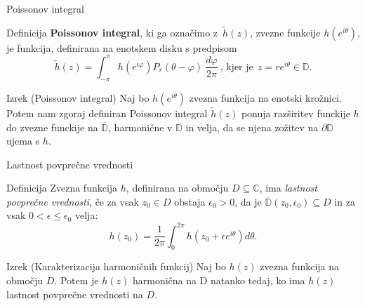 \documentclass{beamer}
\newcommand{\C}{\mathbb C}
\theoremstyle{definition}
\theoremstyle{definition}
\begin{document}
\begin{frame}{Poissonov integral}
   \begin{block}{Definicija}
      \textbf{Poissonov integral}, ki ga označimo z~$\widetilde{h}(z)$, zvezne funkcije $h(e^{i\theta})$, je funkcija, definirana na enotskem disku s predpisom
      $$
      \widetilde{h}(z) = \int_{-\pi}^{\pi}{h(e^{i\varphi}) P_r(\theta - \varphi)~\frac{d\varphi}{2 \pi}}~\text{, kjer je}~~z = r e^{i\theta} \in \mathbb{D}.
      $$
   \end{block}
   \pause
   \begin{exampleblock}{Izrek (Poissonov integral)}
      Naj bo $h(e^{i \theta})$ zvezna funkcija na enotski krožnici. 
      Potem nam zgoraj definiran Poissonov integral $\widetilde{h}(z)$ ponuja razširitev funckije $h$ do zvezne funckije na $\overline{\mathbb{D}}$, harmonične v $\mathbb{D}$ in velja, da
      se njena zožitev na $\partial \mathbb{D}$ ujema s $h$.
   \end{exampleblock}
\end{frame}

\begin{frame}{Lastnost povprečne vrednosti}
   \begin{block}{Definicija} 
      Zvezna funkcija $h$, definirana na območju $D \subseteq \C$, ima \emph{lastnost povprečne vrednosti}, če za vsak $z_0 \in D$ obstaja $\epsilon_0 > 0$, da je $\overline{\mathbb{D}}(z_0, \epsilon_0) \subseteq D$ in za vsak $0 < \epsilon \leq \epsilon_0 $ velja:
      $$
          h(z_0) = \frac{1}{2 \pi} \int_{0}^{2 \pi}{h(z_0 + \epsilon e^{i \theta}) d\theta}.
      $$
   \end{block}
   \pause
   \begin{exampleblock}{Izrek (Karakterizacija harmoničnih funkcij)}
      Naj bo $h(z)$ zvezna funkcija na območju $D$. 
      Potem je $h(z)$ harmonična na D natanko tedaj, ko ima $h(z)$ lastnost povprečne vrednosti na $D$.
   \end{exampleblock}
\end{frame}
\end{document}
